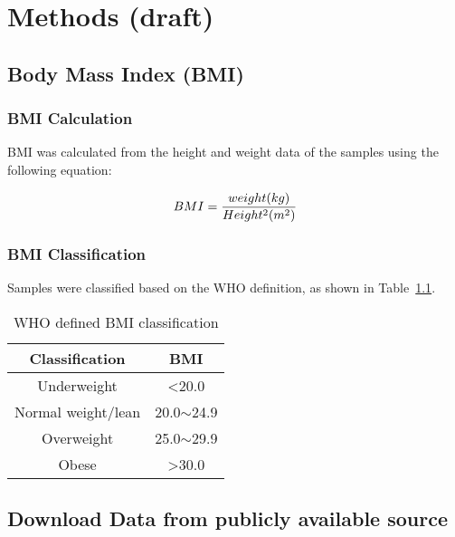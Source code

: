 \chapter{Methods (draft)}
\label{ch:methods}

\section{Body Mass Index (BMI)}
\label{sec:bmi}

\subsection{BMI Calculation}
\label{subsec:bmicalc}

BMI was calculated from the height and weight data of the samples using the following equation:

\begin{equation}
	\label{eq:bmicalc}
	BMI = \frac{weight (kg)}{Height^2(m^2)}\\
\end{equation}

\subsection{BMI Classification}
\label{subsec:bmiclassification}

Samples were classified based on the WHO definition, as shown in Table~\ref{tab:whobmiclass}.
\begin{table}[hb]
	\caption{WHO defined BMI classification}
	\label{tab:whobmiclass}
	\begin{center}
		\begin{tabular}{|c|c|}
			\hline
			\bfseries {Classification} & \bfseries {BMI}\\
			\hline
			Underweight & \textless 20.0\\
			Normal weight/lean & 20.0$\sim$24.9\\
			Overweight & 25.0$\sim$29.9\\
			Obese & \textgreater 30.0\\
			\hline
		\end{tabular}
	\end{center}
\end{table}

\section{Download Data from publicly available source}
\label{sec:data}


